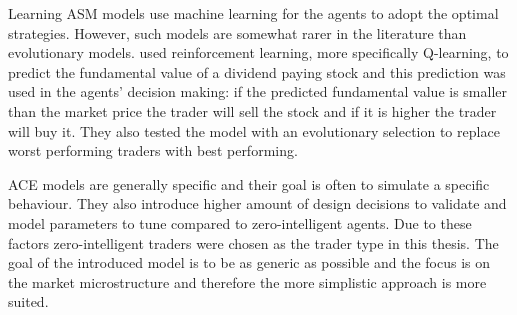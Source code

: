 Learning ASM models use machine learning for the agents to adopt the optimal strategies.
However, such models are somewhat rarer in the literature than evolutionary
models. \citet{Reinforcement09} used reinforcement 
learning, more specifically Q-learning, to predict the fundamental value of a 
dividend paying stock and this prediction was used in the agents' 
decision making: if the predicted fundamental value is smaller than the market price
the trader will sell the stock and if it is higher the trader will buy it. They 
also tested the model with an evolutionary selection to replace worst performing
traders with best performing.



ACE models are generally specific and their goal is often to simulate a specific behaviour.
They also introduce higher amount of design decisions to validate and model parameters 
to tune compared to zero-intelligent agents. Due to these factors zero-intelligent traders
were chosen as the trader type in this thesis. The goal of the introduced model is to be as 
generic as possible and the focus is on the market microstructure and therefore the more 
simplistic approach is more suited.